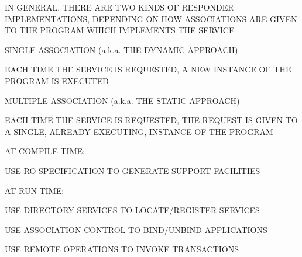 \begin{bwslide}

\begin{nrtc}
\item	IN GENERAL, THERE ARE TWO KINDS OF RESPONDER IMPLEMENTATIONS,
	DEPENDING ON HOW ASSOCIATIONS ARE GIVEN TO THE PROGRAM WHICH
	IMPLEMENTS THE SERVICE

\item	SINGLE ASSOCIATION (a.k.a. THE DYNAMIC APPROACH)
    \begin{nrtc}
    \item	EACH TIME THE SERVICE IS REQUESTED, A NEW INSTANCE OF
		THE PROGRAM IS EXECUTED
    \end{nrtc}

\item	MULTIPLE ASSOCIATION (a.k.a. THE STATIC APPROACH)
    \begin{nrtc}
    \item	EACH TIME THE SERVICE IS REQUESTED, THE REQUEST IS GIVEN TO A
		SINGLE, ALREADY EXECUTING, INSTANCE OF THE PROGRAM
    \end{nrtc}
\end{nrtc}
\end{bwslide}


\begin{bwslide}

\begin{nrtc}
\item	AT COMPILE-TIME:
    \begin{nrtc}
    \item	USE RO-SPECIFICATION TO GENERATE SUPPORT FACILITIES
    \end{nrtc}

\item	AT RUN-TIME:
    \begin{nrtc}
    \item	USE DIRECTORY SERVICES TO LOCATE/REGISTER SERVICES

    \item	USE ASSOCIATION CONTROL TO BIND/UNBIND APPLICATIONS

    \item	USE REMOTE OPERATIONS TO INVOKE TRANSACTIONS
    \end{nrtc}
\end{nrtc}
\end{bwslide}




